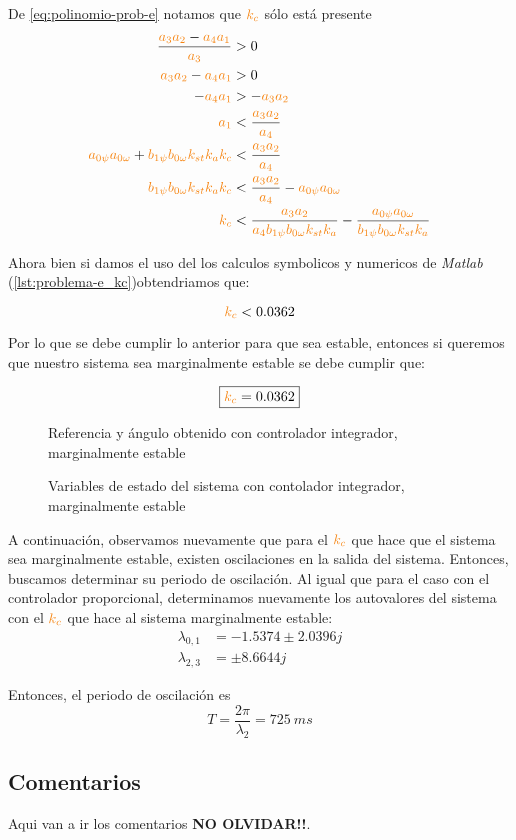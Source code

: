 De \eqref{eq:polinomio-prob-e} notamos que $\nara{k_{c}}$ sólo está presente
\begin{align} 
  \frac{\nara{a_3 a_2} - \nara{a_4 a_1}}{\nara{a_3}} &> 0 \\
  \nara{a_3 a_2} - \nara{a_4 a_1} &> 0 \\
  - \nara{a_4 a_1} &> - \nara{a_3 a_2} \\
  \nara{a_1} &< \frac{\nara{a_3 a_2}}{\nara{a_4}} \\
  \nara{a_{0\psi} a_{0\omega}} + \nara{b_{1\psi} b_{0\omega} k_{st} k_a k_c} &< \frac{\nara{a_3 a_2}}{\nara{a_4}} \\
  \nara{b_{1\psi} b_{0\omega} k_{st} k_a k_c} &< \frac{\nara{a_3 a_2}}{\nara{a_4}} - \nara{a_{0\psi} a_{0\omega}} \\
  \nara{k_c}  &< \frac{\nara{a_3 a_2}}{\nara{a_4 b_{1\psi} b_{0\omega} k_{st} k_a}}  - \frac{\nara{a_{0\psi} a_{0\omega}}}{\nara{b_{1\psi} b_{0\omega} k_{st} k_a}}  \\
\end{align}

Ahora bien si damos el uso del los calculos symbolicos y numericos de \textit{Matlab} (\autoref{lst:problema-e_kc})obtendriamos que: 

\begin{equation}
  \nara{k_c} < 0.0362
\end{equation}

Por lo que se debe cumplir lo anterior para que sea estable, entonces si queremos que nuestro sistema sea marginalmente estable se debe cumplir que:

\begin{equation}
  \boxed{\nara{k_c} = 0.0362}
\end{equation}

\begin{figure}[h]
  \centering
  
  \caption{Referencia y ángulo obtenido con controlador integrador, marginalmente estable}\label{fig:psi-marge-int}
\end{figure}

\begin{figure}[h]
  \centering
  
  \caption{Variables de estado del sistema con contolador integrador, marginalmente estable}\label{fig:estado-marge-int}
\end{figure}

A continuación, observamos nuevamente que para el $\nara{k_{c}}$ que hace que el
sistema sea marginalmente estable, existen oscilaciones en la salida del sistema.
Entonces, buscamos determinar su periodo de oscilación. Al igual que para el caso
con el controlador proporcional, determinamos nuevamente los autovalores del sistema
con el $\nara{k_{c}}$ que hace al sistema marginalmente estable:
\begin{align*}
  \lambda_{0,1} &= -1.5374 \pm 2.0396j \\
  \lambda_{2,3} &= \pm 8.6644j
\end{align*}

Entonces, el periodo de oscilación es
\begin{equation}
  T = \frac{2\pi}{\lambda_{2}} = 725\ \unit{ms}
\end{equation}

\subsection{Comentarios}

Aqui van a ir los comentarios \textbf{NO OLVIDAR!!}.
